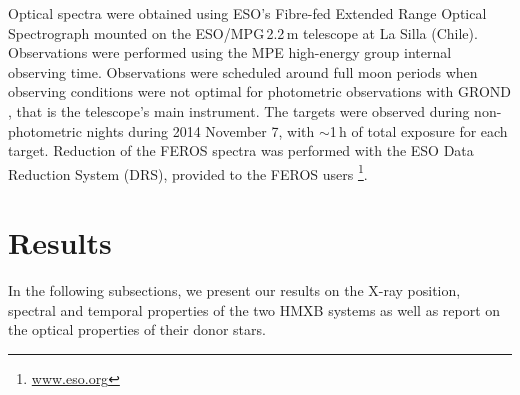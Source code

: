 \documentclass[a4paper,fleqn,usenatbib]{mnras}
\newcommand{\xmm}{{\it XMM-Newton}\xspace}
\newcommand{\canda}{XMMU\,J053108.3-690923\xspace} %
\newcommand{\candb}{XMMU\,J053320.8-684122\xspace} %
\begin{document}
Optical spectra were obtained using ESO's Fibre-fed Extended Range Optical Spectrograph \citep[FEROS,][]{1999Msngr..95....8K} mounted on the ESO/MPG\,2.2\,m telescope at La Silla (Chile).
Observations were performed using the MPE high-energy group internal observing time. Observations were scheduled around full moon periods when observing conditions were not optimal for photometric observations with GROND \citep{2008PASP..120..405G}, that is the telescope's main instrument.
The targets were observed during non-photometric nights during 2014 November 7, with $\sim$1\,h of total exposure for each target.
Reduction of the FEROS spectra was performed with the ESO Data Reduction System (DRS), provided to the FEROS users \footnote{\url{www.eso.org}}. 

\begin{figure*}
  \caption{\xmm/EPIC X-ray (0.3-10.0 keV) light curves with 200\,s binning, and the corresponding hardness ratios using the 0.3-2.0 keV and the 2.0-10.0 keV bands.
  \canda (left) shows clear evidence of periodic bursts every $\sim$2013\,s (red vertical lines).
  During the April 2012 observation (obsid: 0690743801) \candb (right) remained at a relatively constant luminosity ($\sim$0.035 counts s$^{-1}$) for the first $\sim$22\,ks of the exposure, while exhibiting three consecutive bursts separated by $\sim$2200\,s at the end of the exposure.   
  } 
  \label{fig:601_LC}
\end{figure*}

\begin{figure*}
  \caption{Power density spectra of \canda (left) and \candb (observation April 2012, right). 
           For \canda a periodic behaviour is evident at $\sim$2013\,s seen together with two harmonics (red vertical lines).
  } 
  \label{fig:psd}
\end{figure*}


\section{Results}
\label{results}



In the following subsections, we present our results on the X-ray position, spectral and temporal properties of the two HMXB systems as well as report on the optical properties of their donor stars. 
\end{document}
